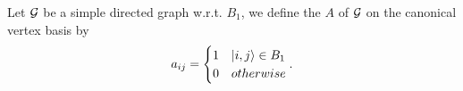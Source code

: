 \documentclass[../2.tex]{subfiles}
\begin{document}
    \begin{defn}
        Let $\mathcal{G}$ be a simple directed graph w.r.t. $B_1$, we define the  $A$ of $\mathcal{G}$ on the canonical vertex basis by
        \[a_{ij} = 
        \begin{cases}
            1 & | i,j \rangle \in B_1 \\
            0 & otherwise \\
        \end{cases}. \]  
    \end{defn}
\end{document}

